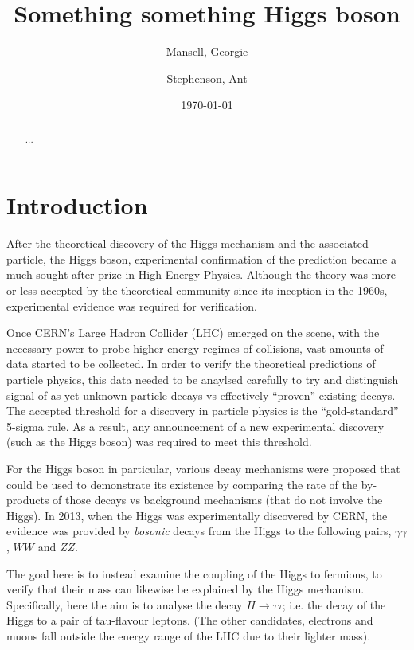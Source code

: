 

\usepackage[toc,page]{appendix}
\usepackage{fancyhdr}
\usepackage{enumitem}
\usepackage{pifont}

\pagestyle{fancy}
\rhead{}
\lhead{}

\author{Mansell, Georgie \and Stephenson, Ant}
\date{\today}
\title{Something something Higgs boson}


\maketitle
\begin{abstract}
    ...
\end{abstract}

\section{Introduction}
After the theoretical discovery of the Higgs mechanism and the associated particle, the Higgs boson, experimental confirmation of the prediction became a much sought-after prize in High Energy Physics. Although the theory was more or less accepted by the theoretical community since its inception in the 1960s, experimental evidence was required for verification. 

Once CERN's Large Hadron Collider (LHC) emerged on the scene, with the necessary power to probe higher energy regimes of collisions, vast amounts of data started to be collected. In order to verify the theoretical predictions of particle physics, this data needed to be anaylsed carefully to try and distinguish signal of as-yet unknown particle decays vs effectively ``proven'' existing decays. The accepted threshold for a discovery in particle physics is the ``gold-standard'' 5-sigma rule. As a result, any announcement of a new experimental discovery (such as the Higgs boson) was required to meet this threshold. 

For the Higgs boson in particular, various decay mechanisms were proposed that could be used to demonstrate its existence by comparing the rate of the by-products of those decays vs background mechanisms (that do not involve the Higgs). In 2013, when the Higgs was experimentally discovered by CERN, the evidence was provided by \emph{bosonic} decays from the Higgs to the following pairs, $\gamma\gamma$, $WW$ and $ZZ$. 

The goal here is to instead examine the coupling of the Higgs to fermions, to verify that their mass can likewise be explained by the Higgs mechanism. Specifically, here the aim is to analyse the decay $H\rightarrow\tau\tau$; i.e. the decay of the Higgs to a pair of tau-flavour leptons. (The other candidates, electrons and muons fall outside the energy range of the LHC due to their lighter mass).

